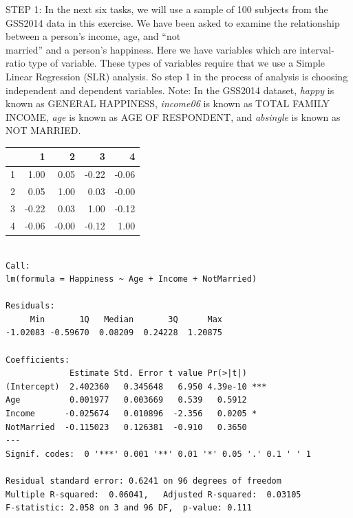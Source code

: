 \documentclass[11pt, chapterprefix=true]{scrbook}\usepackage[]{graphicx}\usepackage[]{color}
\begin{document}
\begin{exercises}
\begin{exercise}
    STEP 1:  In the next six tasks, we will use a sample of 100 subjects from the GSS2014 data in this exercise.  We have been asked to examine the relationship between a person's income, age, and ``not \\ married'' and a person's happiness.  Here we have variables which are  interval-ratio type of variable.  These types of variables require that we use a Simple Linear Regression (SLR) analysis.  So step 1 in the process of analysis is choosing independent and dependent variables.  Note: In the GSS2014 dataset, {\textit{happy}} is known as GENERAL HAPPINESS, {\textit{income06}} is known as TOTAL FAMILY INCOME, {\textit{age}} is known as AGE OF RESPONDENT, and {\textit{absingle}} is known as NOT MARRIED.

{\small{
\begin{table}[ht]
\centering
\begin{tabular}{rrrrr}
  \hline
 & 1 & 2 & 3 & 4 \\ 
  \hline
1 & 1.00 & 0.05 & -0.22 & -0.06 \\ 
  2 & 0.05 & 1.00 & 0.03 & -0.00 \\ 
  3 & -0.22 & 0.03 & 1.00 & -0.12 \\ 
  4 & -0.06 & -0.00 & -0.12 & 1.00 \\ 
   \hline
\end{tabular}
\end{table}

}}

{\tiny{
  \begin{verbatim}

Call:
lm(formula = Happiness ~ Age + Income + NotMarried)

Residuals:
     Min       1Q   Median       3Q      Max 
-1.02083 -0.59670  0.08209  0.24228  1.20875 

Coefficients:
             Estimate Std. Error t value Pr(>|t|)    
(Intercept)  2.402360   0.345648   6.950 4.39e-10 ***
Age          0.001977   0.003669   0.539   0.5912    
Income      -0.025674   0.010896  -2.356   0.0205 *  
NotMarried  -0.115023   0.126381  -0.910   0.3650    
---
Signif. codes:  0 '***' 0.001 '**' 0.01 '*' 0.05 '.' 0.1 ' ' 1

Residual standard error: 0.6241 on 96 degrees of freedom
Multiple R-squared:  0.06041,	Adjusted R-squared:  0.03105 
F-statistic: 2.058 on 3 and 96 DF,  p-value: 0.111


  \end{verbatim}
}}


\end{exercise}
\end{exercises}
\end{document}
